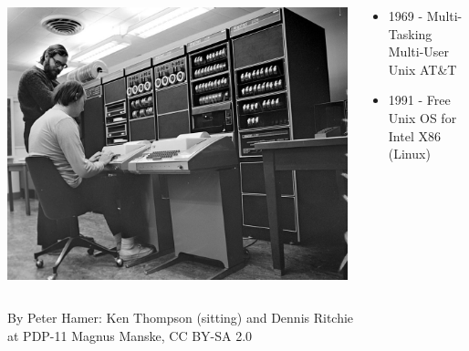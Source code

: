 \documentclass[unknownkeysallowed, 10pt, a4 paper, handout]{beamer}
\begin{document}
\begin{frame}[label=pdp11]
\begin{columns}
\begin{column}{0.50\textwidth}
\begin{center}
      \end{center}
    \end{column}
  \end{columns}
  \begin{columns}
    \begin{column}{0.25\textwidth}
      \begin{center}
        \includegraphics[scale=1.15]{pics/pdp11.jpg} \\
      \end{center}
    \end{column}
    \begin{column}{0.75\textwidth}
      \begin{itemize}
            \item 1969 - Multi-Tasking Multi-User Unix AT\&T
        \item 1991 - Free Unix OS for Intel X86 (Linux)
      \end{itemize}
    \end{column}
  \end{columns}
  \begin{flushleft}
    \tiny{By Peter Hamer: Ken Thompson (sitting) and Dennis Ritchie \\
          at PDP-11 Magnus Manske, CC BY-SA 2.0}
  \end{flushleft}
\end{frame}
\end{document}
